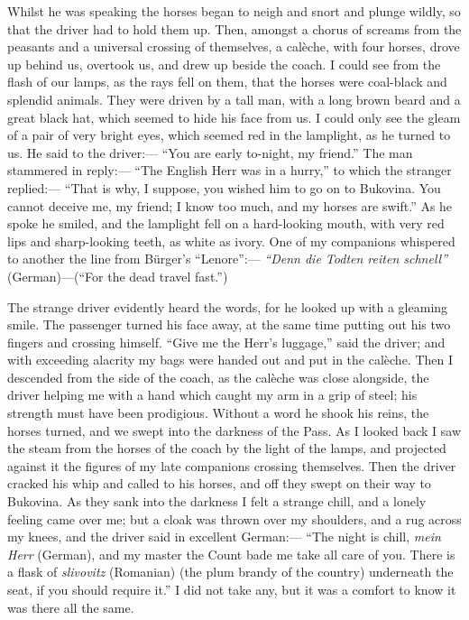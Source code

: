 \documentclass{article}
\begin{document}
				Whilst he was speaking the horses began to neigh and snort and plunge wildly, so that the driver had to hold them up. Then, amongst a chorus of screams from the peasants and a universal crossing of themselves, a calèche, with four horses, drove up behind us, overtook us, and drew up beside the coach. I could see from the flash of our lamps, as the rays fell on them, that the horses were coal-black and splendid animals. They were driven by a tall man, with a long brown beard and a great black hat, which seemed to hide his face from us. I could only see the gleam of a pair of very bright eyes, which seemed red in the lamplight, as he turned to us. He said to the driver:— “You are early to-night, my friend.” The man stammered in reply:— “The English Herr was in a hurry,” to which the stranger replied:— “That is why, I suppose, you wished him to go on to Bukovina. You cannot deceive me, my friend; I know too much, and my horses are swift.” As he spoke he smiled, and the lamplight fell on a hard-looking mouth, with very red lips and sharp-looking teeth, as white as ivory. One of my companions whispered to another the line from Bürger’s “Lenore”:— \textit{“Denn die Todten reiten schnell”} (German)—(“For the dead travel fast.”)\par\bigskip
				
				The strange driver evidently heard the words, for he looked up with a gleaming smile. The passenger turned his face away, at the same time putting out his two fingers and crossing himself. “Give me the Herr’s luggage,” said the driver; and with exceeding alacrity my bags were handed out and put in the calèche. Then I descended from the side of the coach, as the calèche was close alongside, the driver helping me with a hand which caught my arm in a grip of steel; his strength must have been prodigious. Without a word he shook his reins, the horses turned, and we swept into the darkness of the Pass. As I looked back I saw the steam from the horses of the coach by the light of the lamps, and projected against it the figures of my late companions crossing themselves. Then the driver cracked his whip and called to his horses, and off they swept on their way to Bukovina. As they sank into the darkness I felt a strange chill, and a lonely feeling came over me; but a cloak was thrown over my shoulders, and a rug across my knees, and the driver said in excellent German:— “The night is chill, \textit{mein Herr} (German), and my master the Count bade me take all care of you. There is a flask of \textit{slivovitz} (Romanian) (the plum brandy of the country) underneath the seat, if you should require it.” I did not take any, but it was a comfort to know it was there all the same.\par\bigskip
			
\end{document}
